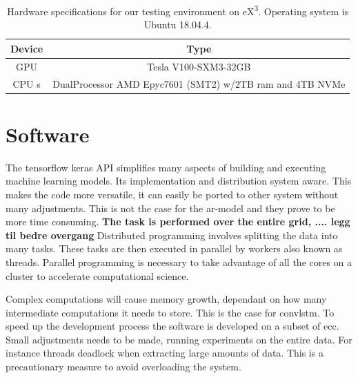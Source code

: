 \begin{table}[ht]
    \centering
    \begin{tabular}{c|c}
        Device &  Type  \\ \hline
        GPU & Tesla V100-SXM3-32GB \\
        CPU s& DualProcessor AMD Epyc7601 (SMT2) w/2TB ram and 4TB NVMe 
    \end{tabular}
    \caption{Hardware specifications for our testing environment on eX\textsuperscript{3}. Operating system is Ubuntu 18.04.4.}
    \label{tab:hardware_ex3}
\end{table}

\section{Software}
The tensorflow keras API simplifies many aspects of building and executing machine learning models. Its implementation and distribution system aware. This makes the code more versatile, it can easily be ported to other system without many adjustments. This is not the case for the \acrshort{ar}-model and they prove to be more time consuming. \textbf{The task is performed over the entire grid,  .... legg til bedre overgang}
Distributed programming involves splitting the data into many tasks. These tasks are then executed in parallel by workers also known as threads. Parallel programming is necessary to take advantage of all the cores on a cluster to accelerate computational science. 

Complex computations will cause memory growth, dependant on how many intermediate computations it needs to store. This is the case for \acrshort{convlstm}. To speed up the development process the software is developed on a subset of \acrshort{ecc}. Small adjustments needs to be made, running experiments on the entire data. For instance threads deadlock when extracting large amounts of data. This is a precautionary measure to avoid overloading the system.



